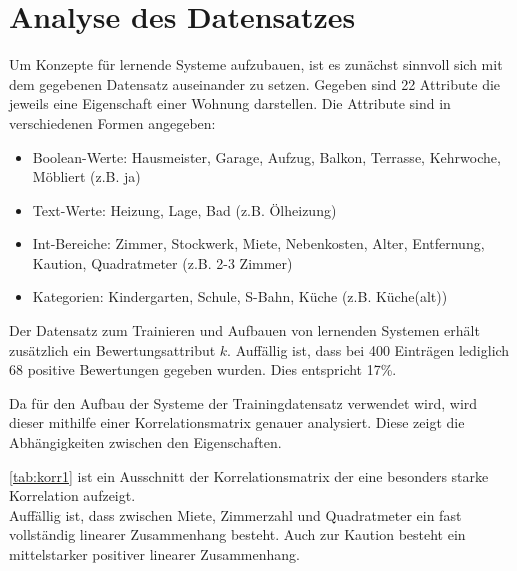 \section{Analyse des Datensatzes}\label{sec:analyse}
Um Konzepte für lernende Systeme aufzubauen, ist es zunächst sinnvoll sich mit 
dem gegebenen Datensatz auseinander zu setzen. 
Gegeben sind 22 Attribute die jeweils eine Eigenschaft einer Wohnung darstellen. 
Die Attribute sind in verschiedenen Formen angegeben: 
\begin{itemize}
    \item Boolean-Werte: Hausmeister, Garage, Aufzug, Balkon, Terrasse, Kehrwoche, Möbliert (z.B. ja)
    \item Text-Werte: Heizung, Lage, Bad (z.B. Ölheizung)
    \item Int-Bereiche: Zimmer, Stockwerk, Miete, Nebenkosten, Alter, Entfernung, Kaution, Quadratmeter (z.B. 2-3 Zimmer)
    \item Kategorien: Kindergarten, Schule, S-Bahn, Küche (z.B. Küche(alt))
\end{itemize}

Der Datensatz zum Trainieren und Aufbauen von lernenden Systemen erhält zusätzlich 
ein Bewertungsattribut $k$. 
Auffällig ist, dass bei 400 Einträgen lediglich 68 positive Bewertungen gegeben wurden. 
Dies entspricht 17\%. 

Da für den Aufbau der Systeme der Trainingdatensatz verwendet wird, wird dieser mithilfe einer Korrelationsmatrix 
genauer analysiert. Diese zeigt die Abhängigkeiten zwischen den Eigenschaften. 

\autoref{tab:korr1} ist ein Ausschnitt der Korrelationsmatrix der eine besonders starke Korrelation aufzeigt. \\
Auffällig ist, dass zwischen Miete, Zimmerzahl und Quadratmeter ein fast vollständig linearer Zusammenhang
besteht. Auch zur Kaution besteht ein mittelstarker positiver linearer Zusammenhang.

